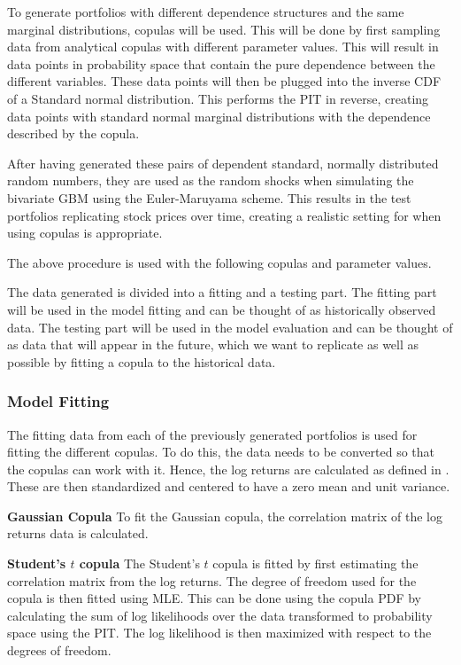 To generate portfolios with different dependence structures and the same marginal distributions, copulas will be used. This will be done by first sampling data from analytical copulas with different parameter values. This will result in data points in probability space that contain the pure dependence between the different variables. These data points will then be plugged into the inverse \gls{CDF} of a Standard normal distribution. This performs the \gls{PIT} in reverse, creating data points with standard normal marginal distributions with the dependence described by the copula. 

After having generated these pairs of dependent standard, normally distributed random numbers, they are used as the random shocks when simulating the bivariate \gls{GBM} using the Euler-Maruyama scheme. This results in the test portfolios replicating stock prices over time, creating a realistic setting for when using copulas is appropriate. 

The above procedure is used with the following copulas and parameter values. 

The data generated is divided into a fitting and a testing part. The fitting part will be used in the model fitting and can be thought of as historically observed data. The testing part will be used in the model evaluation and can be thought of as data that will appear in the future, which we want to replicate as well as possible by fitting a copula to the historical data. 

\subsubsection{Model Fitting}
The fitting data from each of the previously generated portfolios is used for fitting the different copulas. To do this, the data needs to be converted so that the copulas can work with it. Hence, the log returns are calculated as defined in . These are then standardized and centered to have a zero mean and unit variance. 

\textbf{Gaussian Copula}
To fit the Gaussian copula, the correlation matrix of the log returns data is calculated.  

\textbf{Student's $t$ copula} 
The Student's $t$ copula is fitted by first estimating the correlation matrix from the log returns. The degree of freedom used for the copula is then fitted using \gls{MLE}. This can be done using the copula \gls{PDF} by calculating the sum of log likelihoods over the data transformed to probability space using the \gls{PIT}. The log likelihood is then maximized with respect to the degrees of freedom. 

